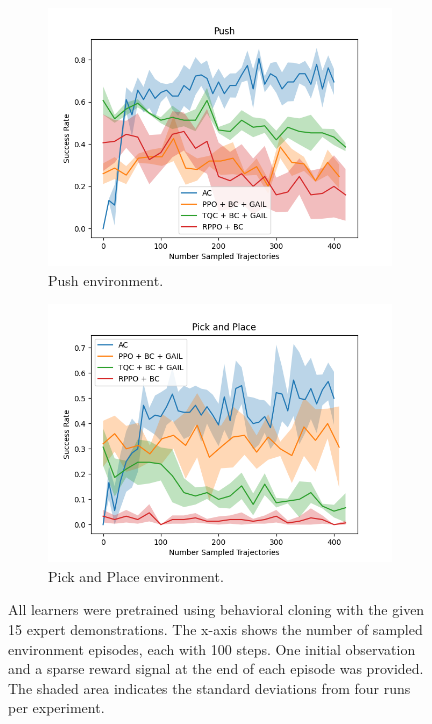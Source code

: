 \begin{figure}[htbp]
\begin{subfigure}[b]{0.45\textwidth}
      \includegraphics[width=\textwidth]{images/15_400/Push.png}
      \caption{Push environment.}
      \label{fig:plot3}
    \end{subfigure}
    \hfill
    \begin{subfigure}[b]{0.45\textwidth}
      \includegraphics[width=\textwidth]{images/15_400/Pick and Place.png}
      \caption{Pick and Place environment.}
      \label{fig:plot4}
    \end{subfigure}
    \caption{All learners were pretrained using behavioral cloning with the given 15 expert demonstrations. 
    The x-axis shows the number of sampled environment episodes, each with 100 steps.  One initial observation and a sparse reward signal at the end of each episode was provided. 
    The shaded area indicates the standard deviations from four runs per experiment.}
    \label{fig:4}
\end{figure}

